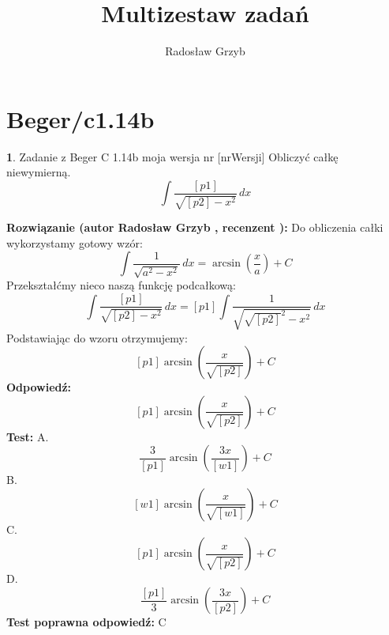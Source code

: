 \documentclass[12pt, a4paper]{article}
\title{Multizestaw zadań}
\author{Radosław Grzyb}
\date{}
\theoremstyle{definition} %
\newtheorem{zad}{}
\newcommand{\kategoria}[1]{\section{#1}} %
\newcommand{\zadStart}[1]{\begin{zad}#1\newline} %
\newcommand{\zadStop}{\end{zad}}   %
\newcommand{\rozwStart}[2]{\noindent \textbf{Rozwiązanie (autor #1 , recenzent #2): }\newline} %
\newcommand{\rozwStop}{\newline}                                            %
\newcommand{\odpStart}{\noindent \textbf{Odpowiedź:}\newline}    %
\newcommand{\odpStop}{\newline}                                             %
\newcommand{\testStart}{\noindent \textbf{Test:}\newline} %
\newcommand{\testStop}{\newline} %
\newcommand{\kluczStart}{\noindent \textbf{Test poprawna odpowiedź:}\newline} %
\newcommand{\kluczStop}{\newline} %
\begin{document}
\maketitle
\kategoria{Beger/c1.14b}
\zadStart{Zadanie z Beger C 1.14b moja wersja nr [nrWersji]}
Obliczyć całkę niewymierną.
$$\int \frac{[p1]}{\sqrt{[p2]-x^{2}}} \,dx$$
\zadStop
\rozwStart{Radosław Grzyb}{}
Do obliczenia całki wykorzystamy gotowy wzór:
$$\int \frac{1}{\sqrt{a^{2}-x^{2}}} \,dx = \arcsin(\frac{x}{a})+C$$
Przekształćmy nieco naszą funkcję podcałkową:
$$\int \frac{[p1]}{\sqrt{[p2]-x^{2}}} \,dx=[p1]\int \frac{1}{\sqrt{\sqrt{[p2]}^{2}-x^{2}}} \,dx$$
Podstawiając do wzoru otrzymujemy:
$$[p1]\arcsin(\frac{x}{\sqrt{[p2]}})+C$$
\rozwStop
\odpStart
$$[p1]\arcsin(\frac{x}{\sqrt{[p2]}})+C$$
\odpStop
\testStart
A.$$\frac{3}{[p1]}\arcsin(\frac{3x}{[w1]})+C$$
B.$$[w1]\arcsin(\frac{x}{\sqrt{[w1]}})+C$$
C.$$[p1]\arcsin(\frac{x}{\sqrt{[p2]}})+C$$
D.$$\frac{[p1]}{3}\arcsin(\frac{3x}{[p2]})+C$$
\testStop
\kluczStart
C
\kluczStop
\end{document}
